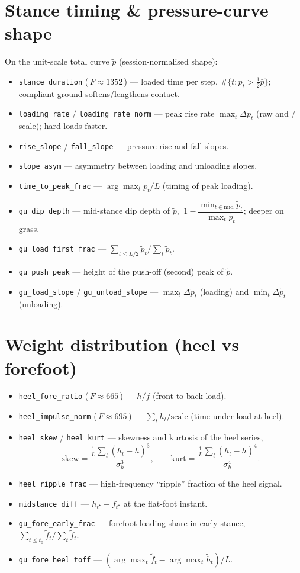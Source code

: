\documentclass[11pt]{article}
\newcommand{\code}[1]{\texttt{#1}}
\newcommand{\Fval}[1]{{\small(\,$F\!\approx\!#1$\,)}}
\begin{document}
\section{Stance timing \& pressure-curve shape}
On the unit-scale total curve $\tilde p$ (session-normalised shape):
\begin{itemize}
  \item \code{stance_duration} \Fval{1352} --- loaded time per step,
  $\#\{t: p_t>\tfrac12\bar p\}$; compliant ground softens/lengthens contact.
  \item \code{loading_rate} / \code{loading_rate_norm} --- peak rise rate $\max_t \Delta p_t$ (raw
  and $/$scale); hard loads faster.
  \item \code{rise_slope} / \code{fall_slope} --- pressure rise and fall slopes.
  \item \code{slope_asym} --- asymmetry between loading and unloading slopes.
  \item \code{time_to_peak_frac} --- $\arg\max_t p_t / L$ (timing of peak loading).
  \item \code{gu_dip_depth} --- mid-stance dip depth of $\tilde p$,
  $\ 1-\dfrac{\min_{t\in\text{mid}}\tilde p_t}{\max_t \tilde p_t}$; deeper on grass.
  \item \code{gu_load_first_frac} --- $\sum_{t\le L/2}\tilde p_t\big/\sum_t \tilde p_t$.
  \item \code{gu_push_peak} --- height of the push-off (second) peak of $\tilde p$.
  \item \code{gu_load_slope} / \code{gu_unload_slope} --- $\max_t \Delta\tilde p_t$ (loading) and
  $\min_t \Delta\tilde p_t$ (unloading).
\end{itemize}

\section{Weight distribution (heel vs forefoot)}
\begin{itemize}
  \item \code{heel_fore_ratio} \Fval{665} --- $\bar h/\bar f$ (front-to-back load).
  \item \code{heel_impulse_norm} \Fval{695} --- $\sum_t h_t/\text{scale}$ (time-under-load at heel).
  \item \code{heel_skew} / \code{heel_kurt} --- skewness and kurtosis of the heel series,
  \[
  \text{skew}=\frac{\tfrac1L\sum_t (h_t-\bar h)^3}{\sigma_h^{3}},\qquad
  \text{kurt}=\frac{\tfrac1L\sum_t (h_t-\bar h)^4}{\sigma_h^{4}} .
  \]
  \item \code{heel_ripple_frac} --- high-frequency ``ripple'' fraction of the heel signal.
  \item \code{midstance_diff} --- $h_{t^\star}-f_{t^\star}$ at the flat-foot instant.
  \item \code{gu_fore_early_frac} --- forefoot loading share in early stance,
  $\sum_{t\le t_0}\tilde f_t/\sum_t\tilde f_t$.
  \item \code{gu_fore_heel_toff} --- $(\arg\max_t \tilde f_t-\arg\max_t \tilde h_t)/L$.
\end{itemize}
\end{document}
